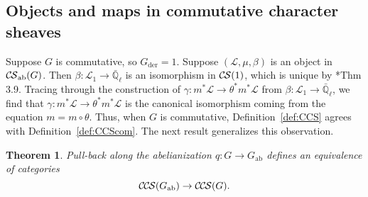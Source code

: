 \documentclass[10pt]{amsart}
\theoremstyle{plain}
\newtheorem{theorem}{Theorem}[section]
\theoremstyle{definition}
\newcommand{\EE}{\mathbb{\bar Q}_\ell}
\newcommand{\Fq}{k}
\newcommand{\der}{_{\operatorname{der}}}
\newcommand{\ab}{_{\operatorname{ab}}}
\newcommand{\cs}[1]{{\mathcal{#1}}}
\newcommand{\CS}{{\mathcal{C\hskip-0.8pt S}}}
\newcommand{\CCS}{{\mathcal{C\hskip-.8pt C\hskip-0.8pt S}}}
\newcommand{\CSab}{\CS_{\operatorname{ab}}}
\begin{document}
\subsection{Objects and maps in commutative character sheaves} \label{ssec:obmor}

Suppose $G$ is commutative, so $G\der = 1$. 
Suppose $(\cs{L},\mu,\beta)$ is an object in $\CSab(G)$.
Then $\beta : \cs{L}_1\to \EE$ is an isomorphism in $\CS(1)$, which is unique by \cite{cunningham-roe:13a}*{Thm 3.9}.
Tracing through the construction of $\gamma : m^*\cs{L} \to \theta^*m^*\cs{L}$ from $\beta : \cs{L}_1\to \EE$, we find 
that $\gamma : m^*\cs{L} \to \theta^*m^*\cs{L}$ is the canonical isomorphism coming from the equation $m = m \circ \theta$. 
Thus, when $G$ is commutative, Definition~\ref{def:CCS} agrees with Definition~\ref{def:CCScom}.
The next result generalizes this observation.


\begin{theorem}\label{thm:Gab}
Pull-back along the abelianization $q : G \to G\ab$
defines an equivalence of categories 
\[
\CCS(G\ab) \to \CCS(G).
\]
\end{theorem}
\end{document}
